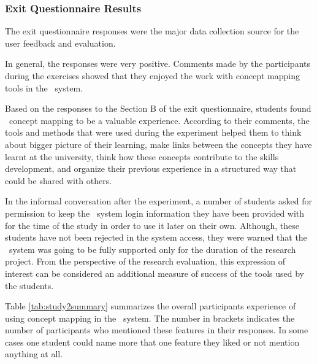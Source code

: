 \subsubsection{Exit Questionnaire Results}
The exit questionnaire responses were the major data collection source for the
user feedback and evaluation.

In general, the responses were very positive. Comments made by the participants
during the exercises showed that they enjoyed the work with concept mapping
tools in the \ep~system.

Based on the responses to the Section B of the exit questionnaire, students
found \ep~concept mapping to be a valuable experience. According to their
comments, the tools and methods that were used during the experiment helped
them to think about bigger picture of their learning, make links between the
concepts they have learnt at the university, think how these concepts contribute
to the skills development, and organize their previous experience in a 
structured way that could be shared with others.

In the informal conversation after the experiment, a number of students asked
for permission to keep the \ep~system login information they have been provided
with for the time of the study in order to use it later on their own. Although,
these students have not been rejected in the system access, they were warned
that the \ep~system was going to be fully supported only for the duration of the
research project. From the perspective of the research evaluation, this
expression of interest can be considered an additional measure of success of the
tools used by the students.

Table \ref{tab:study2summary} summarizes the overall participants experience of
using concept mapping in the \ep~system. The number in brackets indicates the
number of participants who mentioned these features in their responses. In
some cases one student could name more that one feature they liked or not
mention anything at all.

